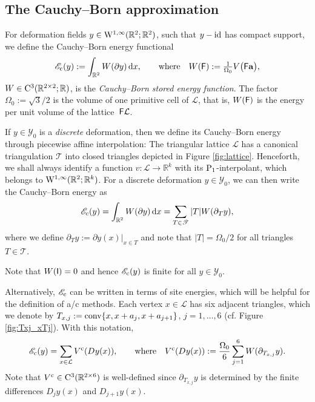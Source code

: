 \documentclass[12pt, reqno, a4paper]{amsart}
\numberwithin{equation}{section}
\numberwithin{theorem}{section}
\numberwithin{remark}{section}
\begin{document}
\subsection{The Cauchy--Born approximation}
\label{sec:flat:cb}
For deformation fields $y \in {{\rm W}}^{1,\infty}({\mathbb{R}}^2; {\mathbb{R}}^2)$, such that
$y - {{\rm id}}$ has compact support, we define the Cauchy--Born energy
functional
\begin{displaymath}
  {{\mathscr{E}}_{{\rm c}}}(y) := \int_{{\mathbb{R}}^2} W({\partial} y) {\,{\rm d}x}, \qquad \text{where} \quad
  W({{\sf F}}) := {{\textstyle \frac{{1}}{{\Omega_0}}}}V\big( {{\sf F}} \mathbf{a} \big),
\end{displaymath}
$W \in {{\rm C}}^3({\mathbb{R}}^{2 \times 2}; {\mathbb{R}})$, is the {\em Cauchy--Born stored
  energy function}.
The factor $\Omega_0:=\sqrt{3}/2$ is the volume of one primitive cell
of ${\mathcal{L}}$, that is, $W({{\sf F}})$ is the energy per unit volume of the
lattice~${{\sf F}} {\mathcal{L}}$.

If $y \in {\mathscr{Y}}_0$ is a {\em discrete} deformation, then we define its
Cauchy--Born energy through piecewise affine interpolation: The
triangular lattice ${\mathcal{L}}$ has a canonical triangulation ${\mathscr{T}}$ into closed
triangles depicted in Figure \ref{fig:lattice}.
Henceforth, we shall always identify a function $v : {\mathcal{L}} \to {\mathbb{R}}^k$ with
its ${{\rm P}_1}$-interpolant, which belongs to
${{\rm W}}^{1,\infty}({\mathbb{R}}^2;{\mathbb{R}}^k)$. For a discrete deformation $y \in {\mathscr{Y}}_0$,
we can then write the Cauchy--Born energy as
\begin{equation}
  \label{eq:defn_Ec_W}
  {{\mathscr{E}}_{{\rm c}}}(y) = \int_{{\mathbb{R}}^2} W({\partial} y) {\,{\rm d}x} 
  = \sum_{T \in {\mathscr{T}}} |T| W({\partial_{{T}}} y),
\end{equation}
where we define ${\partial_{{T}}} y := {\partial} y(x)|_{x \in T}$ and note that $|T| =
\Omega_0/2$ for all triangles $T \in {\mathscr{T}}$.

Note that $W({{\sf I}}) = 0$ and hence ${{\mathscr{E}}_{{\rm c}}}(y)$ is finite for all $y \in
{\mathscr{Y}}_0$.

Alternatively, ${{\mathscr{E}}_{{\rm c}}}$ can be written in terms of site energies, which
will be helpful for the definition of a/c methods. Each vertex $x \in
{\mathcal{L}}$ has six adjacent triangles, which we denote by $T_{x, j} :=
{{\rm conv}}\{ x, x+a_j, x+a_{j+1}\}$, $j = 1,\dots, 6$ (cf. Figure
\ref{fig:Txj_xTj}). With this notation, 
\begin{equation}
  \label{eq:defn_Vc}
  {{\mathscr{E}}_{{\rm c}}}(y) = \sum_{x \in {\mathcal{L}}} {V^{{\rm c}}}({D_{{}}} y(x)), \qquad \text{where} \quad
  {V^{{\rm c}}}({D_{{}}}y(x)) := \frac{\Omega_0}{6} \sum_{j = 1}^6 W({\partial_{{T_{x,j}}}}
  y).
\end{equation}
Note that ${V^{{\rm c}}} \in {{\rm C}}^3({\mathbb{R}}^{2 \times 6})$ is well-defined since
${\partial_{{T_{x,j}}}} y$ is determined by the finite differences ${D_{{j}}} y(x)$
and ${D_{{j+1}}} y(x)$.
\end{document}
